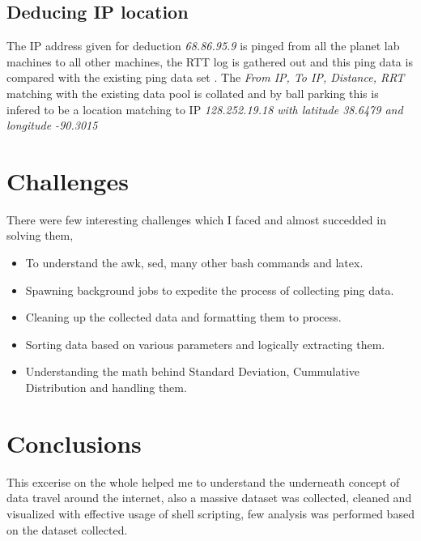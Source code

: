 \documentclass[twocolumn]{article}
\begin{document}
\subsection{Deducing IP location}
The IP address given for deduction \textit{68.86.95.9} is pinged from all the planet lab machines to all other machines, the RTT log is gathered out and this ping data is compared with the existing ping data set . The \textit{From IP, To IP, Distance, RRT} matching with the existing data pool is collated and by ball parking this is infered to be a location matching to IP \textit{128.252.19.18 with latitude 38.6479  and longitude -90.3015}

\section{Challenges}
There were few interesting challenges which I faced and almost succedded in solving them,
\begin{itemize}
\item To understand the awk, sed, many other bash commands and latex.
\item Spawning background jobs to expedite the process of collecting ping data.
\item Cleaning up the collected data and formatting them to process.
\item Sorting data based on various parameters and logically extracting them.
\item Understanding the math behind Standard Deviation, Cummulative Distribution and handling them.
\end{itemize}

\section{Conclusions}
This excerise on the whole helped me to understand the underneath concept of data travel around the internet, also a massive dataset was collected, cleaned and visualized with effective usage of shell scripting, few analysis was performed based on the dataset collected. 
\end{document}
